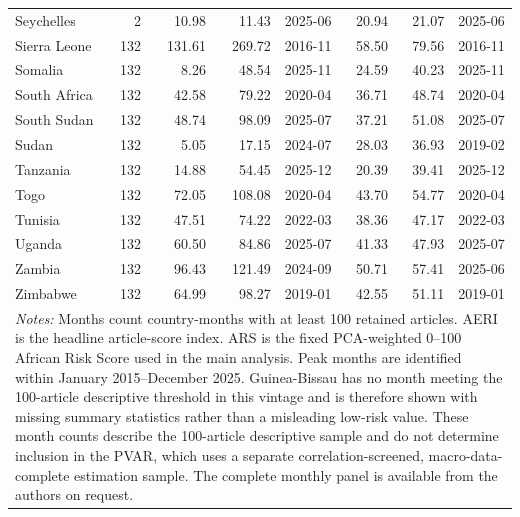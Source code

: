 \begin{longtable}{lrrrlrrl}
Seychelles & 2 & 10.98 & 11.43 & 2025-06 & 20.94 & 21.07 & 2025-06\\
Sierra Leone & 132 & 131.61 & 269.72 & 2016-11 & 58.50 & 79.56 & 2016-11\\
Somalia & 132 & 8.26 & 48.54 & 2025-11 & 24.59 & 40.23 & 2025-11\\
South Africa & 132 & 42.58 & 79.22 & 2020-04 & 36.71 & 48.74 & 2020-04\\
South Sudan & 132 & 48.74 & 98.09 & 2025-07 & 37.21 & 51.08 & 2025-07\\
Sudan & 132 & 5.05 & 17.15 & 2024-07 & 28.03 & 36.93 & 2019-02\\
Tanzania & 132 & 14.88 & 54.45 & 2025-12 & 20.39 & 39.41 & 2025-12\\
Togo & 132 & 72.05 & 108.08 & 2020-04 & 43.70 & 54.77 & 2020-04\\
Tunisia & 132 & 47.51 & 74.22 & 2022-03 & 38.36 & 47.17 & 2022-03\\
Uganda & 132 & 60.50 & 84.86 & 2025-07 & 41.33 & 47.93 & 2025-07\\
Zambia & 132 & 96.43 & 121.49 & 2024-09 & 50.71 & 57.41 & 2025-06\\
Zimbabwe & 132 & 64.99 & 98.27 & 2019-01 & 42.55 & 51.11 & 2019-01\\
\multicolumn{8}{p{0.97\textwidth}}{\footnotesize\textit{Notes:} Months count country-months with at least 100 retained articles. AERI is the headline article-score index. ARS is the fixed PCA-weighted 0--100 African Risk Score used in the main analysis. Peak months are identified within January 2015--December 2025. Guinea-Bissau has no month meeting the 100-article descriptive threshold in this vintage and is therefore shown with missing summary statistics rather than a misleading low-risk value. These month counts describe the 100-article descriptive sample and do not determine inclusion in the PVAR, which uses a separate correlation-screened, macro-data-complete estimation sample. The complete monthly panel is available from the authors on request.}\\
\end{longtable}